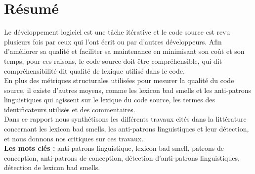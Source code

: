 \chapter*{Résumé}%

\label{Chapter2} %




Le développement logiciel est une tâche itérative et le code source est revu plusieurs fois par ceux qui l'ont écrit ou par d'autres développeurs.
Afin d'améliorer sa qualité et faciliter sa maintenance en minimisant son coût et son temps, pour ces raisons, le code source doit être compréhensible, qui dit compréhensibilité dit qualité de lexique utilisé dans le code.\vspace{5px}\\
En plus des métriques structurales utilisées pour mesurer la qualité du code source, il existe d'autres moyens, comme les lexicon bad smells et les anti-patrons linguistiques qui agissent sur le lexique du code source, les termes des identificateurs utilisés et des commentaires.
\vspace{5px}\\
Dans ce rapport nous synthétisons les différents travaux cités dans la littérature concernant les lexicon bad smells, les anti-patrons linguistiques et leur détection, et nous donnons nos critiques sur ces travaux.\vspace{5px}\\
\tab \textbf{Les mots clés : } anti-patrons linguistique, lexicon bad smell, patrons de conception, anti-patrons de conception, détection d'anti-patrons linguistiques, détection de lexicon bad smells.

